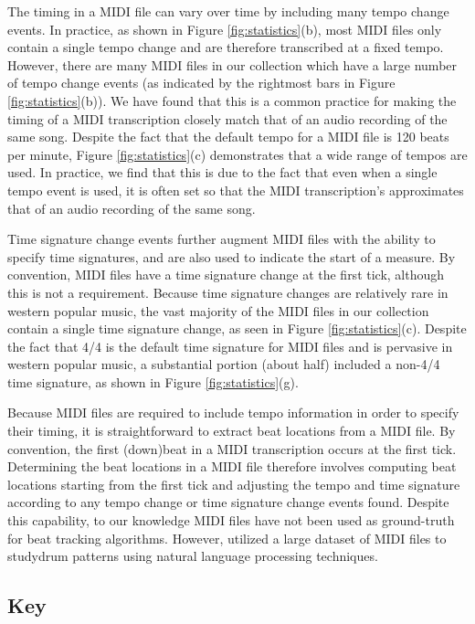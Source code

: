 \documentclass{article}
\begin{document}
The timing in a MIDI file can vary over time by including many tempo change events.
In practice, as shown in Figure \ref{fig:statistics}(b), most MIDI files only contain a single tempo change and are therefore transcribed at a fixed tempo.
However, there are many MIDI files in our collection which have a large number of tempo change events (as indicated by the rightmost bars in Figure \ref{fig:statistics}(b)).
We have found that this is a common practice for making the timing of a MIDI transcription closely match that of an audio recording of the same song.
Despite the fact that the default tempo for a MIDI file is 120 beats per minute, Figure \ref{fig:statistics}(c) demonstrates that a wide range of tempos are used.
In practice, we find that this is due to the fact that even when a single tempo event is used, it is often set so that the MIDI transcription's approximates that of an audio recording of the same song.

Time signature change events further augment MIDI files with the ability to specify time signatures, and are also used to indicate the start of a measure.
By convention, MIDI files have a time signature change at the first tick, although this is not a requirement.
Because time signature changes are relatively rare in western popular music, the vast majority of the MIDI files in our collection contain a single time signature change, as seen in Figure \ref{fig:statistics}(c).
Despite the fact that 4/4 is the default time signature for MIDI files and is pervasive in western popular music, a substantial portion (about half) included a non-4/4 time signature, as shown in Figure \ref{fig:statistics}(g).

Because MIDI files are required to include tempo information in order to specify their timing, it is straightforward to extract beat locations from a MIDI file.
By convention, the first (down)beat in a MIDI transcription occurs at the first tick.
Determining the beat locations in a MIDI file therefore involves computing beat locations starting from the first tick and adjusting the tempo and time signature according to any tempo change or time signature change events found.
Despite this capability, to our knowledge MIDI files have not been used as ground-truth for beat tracking algorithms.
However, \cite{mauch2012corpus} utilized a large dataset of MIDI files to studydrum patterns using natural language processing techniques.


\subsection{Key}
\end{document}
